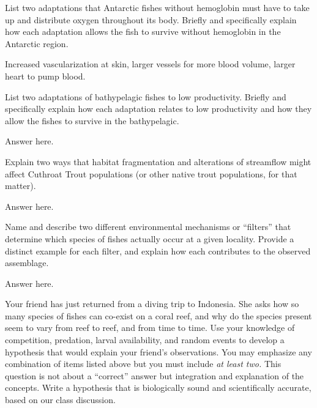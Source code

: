 \documentclass[11pt, addpoints]{exam}
\newcommand*\AnswerBox[3]{%
    \parbox[t][#1]{0.92\textwidth}{%
    \begin{solution}#3\end{solution}}
    \vspace*{\stretch{#2}}
}
\begin{document}
\begin{questions}

\question[10]
List two adaptations that Antarctic fishes without hemoglobin must have to take up and distribute oxygen throughout its body. Briefly and specifically explain how each adaptation allows the fish to survive without hemoglobin in the Antarctic region.

\AnswerBox{0.2\textheight}{1}{%
Increased vascularization at skin, larger vessels for more blood volume, larger heart to pump blood.}

\question[10]
List two adaptations of bathypelagic fishes to low productivity. Briefly and specifically explain how each adaptation relates to low productivity and how they allow the fishes to survive in the bathypelagic. 

\AnswerBox{0.2\textheight}{1}{%
Answer here.}

\question[5]


Explain two ways that habitat fragmentation and alterations of streamflow might affect Cuthroat Trout populations (or other native trout populations, for that matter).

\AnswerBox{0.2\textheight}{1}{%
Answer here.}


\newpage

\question[5]
Name and describe two different environmental mechanisms or “filters” that determine which species of fishes actually occur at a given locality.  Provide a distinct example for each filter, and explain how each contributes to the observed assemblage.

\AnswerBox{0.2\textheight}{1}{%
Answer here.}


\question[10]
Your friend has just returned from a diving trip to Indonesia.  She asks how so many species of fishes can co-exist on a coral reef, and why do the species present seem to vary from reef to reef, and from time to time. Use your knowledge of competition, predation, larval availability, and random events to develop a hypothesis that would explain your friend’s observations.  You may emphasize any combination of items listed above but you must include \emph{at least two.}  This question is not about a “correct” answer but integration and explanation of the concepts.  Write a hypothesis that is biologically sound and scientifically accurate, based on our class discussion.


\end{questions}
\end{document}
